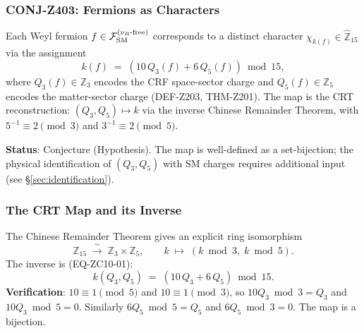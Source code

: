 \documentclass[12pt, a4paper]{article}
\begin{document}
\subsubsection{CONJ-Z403: Fermions as Characters}

\begin{openqbox}[title={CONJ-Z403 (Pontryagin form) --- Open}]
Each Weyl fermion $f \in \mathcal{F}_{\rm SM}^{(\nu_R\text{-free})}$
corresponds to a distinct character $\chi_{k(f)} \in \hat{\mathbb{Z}}_{15}$
via the assignment
\begin{equation}
  k(f) \;=\; (10\,Q_3(f) + 6\,Q_5(f)) \bmod 15,
  \label{eq:crt-map}
\end{equation}
where $Q_3(f) \in \mathbb{Z}_3$ encodes the CRF space-sector charge
and $Q_5(f) \in \mathbb{Z}_5$ encodes the matter-sector charge
(DEF-Z203, THM-Z201). The map is the CRT
reconstruction: $(Q_3, Q_5) \mapsto k$ via the
inverse Chinese Remainder Theorem, with $5^{-1} \equiv 2 \pmod{3}$
and $3^{-1} \equiv 2 \pmod{5}$.

\textbf{Status}: Conjecture (Hypothesis). The map is
well-defined as a set-bijection; the physical identification of
$(Q_3, Q_5)$ with SM charges requires additional input
(see \S\ref{sec:identification}).
\end{openqbox}

\subsubsection{The CRT Map and its Inverse}

\begin{formalbox}[title={DEF-ZC10-02: CRT bijection on $\mathbb{Z}_{15}$}]
The Chinese Remainder Theorem gives an explicit ring isomorphism
\begin{equation}
  \mathbb{Z}_{15} \;\xrightarrow{\;\sim\;}\; \mathbb{Z}_3 \times \mathbb{Z}_5,
  \qquad k \;\mapsto\; (k \bmod 3,\; k \bmod 5).
  \label{eq:crt-forward}
\end{equation}
The inverse is (EQ-ZC10-01):
\begin{equation}
  k(Q_3, Q_5) \;=\; (10\,Q_3 + 6\,Q_5) \bmod 15.
  \label{eq:crt-inverse}
\end{equation}
\textbf{Verification}: $10 \equiv 1 \pmod{5}$ and
$10 \equiv 1 \pmod{3}$, so $10 Q_3 \bmod 3 = Q_3$ and
$10 Q_3 \bmod 5 = 0$. Similarly $6 Q_5 \bmod 5 = Q_5$ and
$6 Q_5 \bmod 3 = 0$. The map is a bijection.
\end{formalbox}

\end{document}
